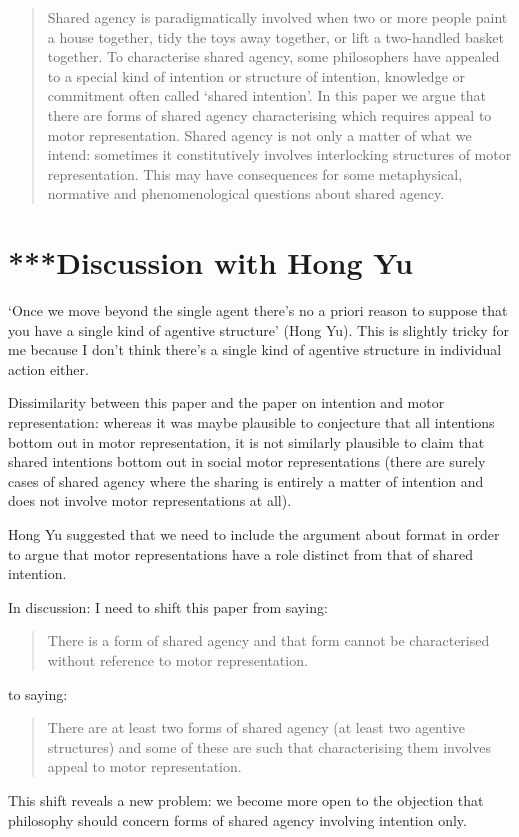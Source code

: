 \documentclass[12pt,\papersize]{extarticle}
\begin{document}
\setlength\footnotesep{1em}


\maketitle
\title{}

\begin{abstract}
\noindent
Shared agency is paradigmatically involved when two or more people paint a house together, tidy the toys away together, or lift a two-handled basket together.  
To characterise shared agency, some philosophers have appealed to a special kind of intention or structure of intention, knowledge or commitment often called `shared intention'.  
In this paper we argue that there are forms of shared agency characterising which requires appeal to  motor representation.  
Shared agency is not only a matter of what we intend: sometimes it  constitutively involves interlocking structures of motor representation.  This may have consequences for some metaphysical, normative and phenomenological questions about shared agency.

\end{abstract}

\section{***Discussion with Hong Yu}
`Once we move beyond the single agent there's no a priori reason to suppose that you have a single kind of agentive structure' (Hong Yu).
This is slightly tricky for me because I don't think there's a single kind of agentive structure in individual action either.

Dissimilarity between this paper and the paper on intention and motor representation: whereas it was maybe plausible to conjecture that all intentions bottom out in motor representation, it is not similarly plausible to claim that shared intentions bottom out in social motor representations (there are surely cases of shared agency where the sharing is entirely a matter of intention and does not involve motor representations at all).

Hong Yu suggested that we need to include the argument about format in order to argue that motor representations have a role distinct from that of shared intention.

In discussion: I need to shift this paper from saying:
\begin{quote}
There is a form of shared agency and that form cannot be characterised without reference to motor representation.
\end{quote}
to saying:
\begin{quote}
There are at least two forms of shared agency (at least two agentive structures) and some of these are such that characterising them involves appeal to motor representation.
\end{quote}
This shift reveals a new problem: we become more open to the objection that philosophy should concern forms of shared agency involving intention only.
\end{document}
